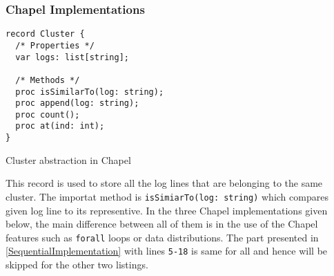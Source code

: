 \documentclass{article}
\begin{document}
\subsubsection{Chapel Implementations}
\begin{listing}[H]
\begin{verbatim}
record Cluster {
  /* Properties */
  var logs: list[string];

  /* Methods */
  proc isSimilarTo(log: string);
  proc append(log: string);
  proc count();
  proc at(ind: int);
}
\end{verbatim}
\caption{Cluster abstraction in Chapel}
\end{listing}

This record is used to store all the log lines that are belonging to the same cluster.
The importat method is \texttt{isSimiarTo(log: string)} which compares given log line
to its representive. In the three Chapel implementations given below, the main difference between all of them is in the use of the Chapel features such as \texttt{forall} loops or data distributions. The part presented in \ref{SequentialImplementation} with lines \texttt{5-18} is same for all and hence will be skipped for the other two listings.
\end{document}
